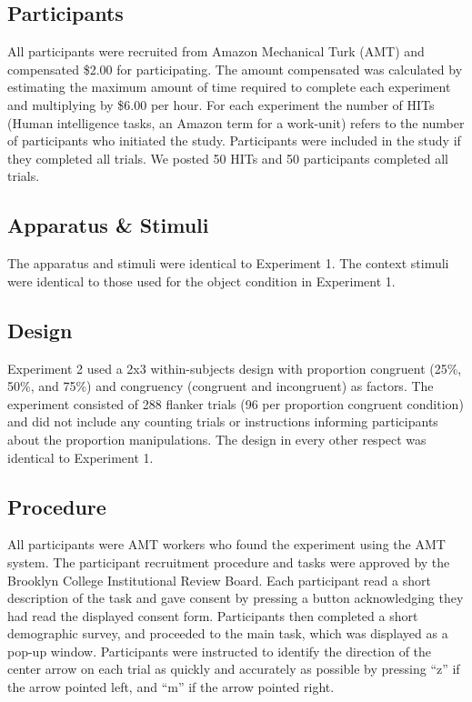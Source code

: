 \documentclass[english,,man,floatsintext]{apa6}
\begin{document}
\hypertarget{participants-1}{%
\subsection{Participants}\label{participants-1}}

All participants were recruited from Amazon Mechanical Turk (AMT) and compensated \$2.00 for participating. The amount compensated was calculated by estimating the maximum amount of time required to complete each experiment and multiplying by \$6.00 per hour. For each experiment the number of HITs (Human intelligence tasks, an Amazon term for a work-unit) refers to the number of participants who initiated the study. Participants were included in the study if they completed all trials. We posted 50 HITs and 50 participants completed all trials.

\hypertarget{apparatus-stimuli-1}{%
\subsection{Apparatus \& Stimuli}\label{apparatus-stimuli-1}}

The apparatus and stimuli were identical to Experiment 1. The context stimuli were identical to those used for the object condition in Experiment 1.

\hypertarget{design-1}{%
\subsection{Design}\label{design-1}}

Experiment 2 used a 2x3 within-subjects design with proportion congruent (25\%, 50\%, and 75\%) and congruency (congruent and incongruent) as factors. The experiment consisted of 288 flanker trials (96 per proportion congruent condition) and did not include any counting trials or instructions informing participants about the proportion manipulations. The design in every other respect was identical to Experiment 1.

\hypertarget{procedure-1}{%
\subsection{Procedure}\label{procedure-1}}

All participants were AMT workers who found the experiment using the AMT system. The participant recruitment procedure and tasks were approved by the Brooklyn College Institutional Review Board. Each participant read a short description of the task and gave consent by pressing a button acknowledging they had read the displayed consent form. Participants then completed a short demographic survey, and proceeded to the main task, which was displayed as a pop-up window. Participants were instructed to identify the direction of the center arrow on each trial as quickly and accurately as possible by pressing \enquote{z} if the arrow pointed left, and \enquote{m} if the arrow pointed right.
\end{document}
